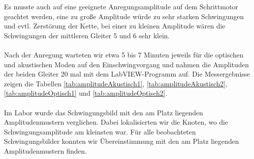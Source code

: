 \documentclass[a4paper,titlepage]{scrartcl}
\numberwithin{equation}{section}
\begin{document}
Es musste auch auf eine geeignete Anregungsamplitude auf dem Schrittmotor geachtet werden, eine zu große Amplitude würde zu sehr starken Schwingungen und evtl. Zerstörung der Kette, bei einer zu kleinen Amplitude wären die Schwingungen der mittleren Gleiter 5 und 6 sehr klein. \\ \\
Nach der Anregung warteten wir etwa 5 bis 7 Minuten jeweils für die optischen und akustischen Moden auf den Einschwingvorgang und nahmen die Amplituden der beiden Gleiter 20 mal mit dem LabVIEW-Programm auf. Die Messergebnisse zeigen die Tabellen \ref{tab:amplitudeAkustisch1}, \ref{tab:amplitudeAkustisch2}, \ref{tab:amplitudeOptisch1} und \ref{tab:amplitudeOptisch2}.\\ \\
Im Labor wurde das Schwingungsbild mit den am Platz liegenden Amplitudenmustern verglichen. Dabei lokalisierten wir die Knoten, wo die Schwingungsamplitude am kleinsten war. Für alle beobachteten Schwingungsbilder konnten wir Übereinstimmung mit den am Platz liegenden Amplitudenmustern finden.
\end{document}
